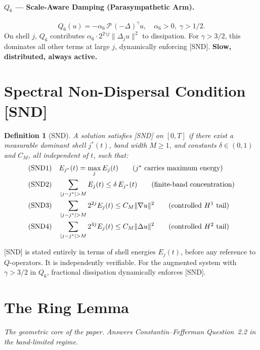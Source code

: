 \documentclass[11pt]{article}
\newtheorem{definition}[theorem]{Definition}
\begin{document}
\paragraph{$Q_6$ --- Scale-Aware Damping (Parasympathetic Arm).}
\[
Q_6(u) = -\alpha_6\,\mathcal{P}\,(-\Delta)^\gamma u,\quad \alpha_6>0,\;\gamma>1/2.
\]
On shell $j$, $Q_6$ contributes $\alpha_6\cdot 2^{2\gamma j}\|\Delta_j u\|^2$ to dissipation.
For $\gamma > 3/2$, this dominates all other terms at large $j$, dynamically enforcing [SND].
\textbf{Slow, distributed, always active.}

\section{Spectral Non-Dispersal Condition [SND]}

\begin{definition}[SND]
A solution satisfies \emph{[SND]} on $[0,T]$ if there exist a measurable dominant shell $j^*(t)$,
band width $M\geq 1$, and constants $\delta\in(0,1)$ and $C_M$, all independent of $t$, such that:
\begin{align}
&\textup{(SND1)}\quad E_{j^*}(t) = \max_j E_j(t)\tag{$j^*$ carries maximum energy}\\
&\textup{(SND2)}\quad \sum_{|j-j^*|>M} E_j(t) \leq \delta\, E_{j^*}(t)\tag{finite-band concentration}\\
&\textup{(SND3)}\quad \sum_{|j-j^*|>M} 2^{2j} E_j(t) \leq C_M\|\nabla u\|^2\tag{controlled $H^1$ tail}\\
&\textup{(SND4)}\quad \sum_{|j-j^*|>M} 2^{4j} E_j(t) \leq C_M\|\Delta u\|^2\tag{controlled $H^2$ tail}
\end{align}
\end{definition}

[SND] is stated entirely in terms of shell energies $E_j(t)$, before any reference to
$Q$-operators. It is independently verifiable. For the augmented system with $\gamma>3/2$ in
$Q_6$, fractional dissipation dynamically enforces [SND].

\section{The Ring Lemma}

\textit{The geometric core of the paper. Answers Constantin--Fefferman Question~2.2 in the
band-limited regime.}
\end{document}
